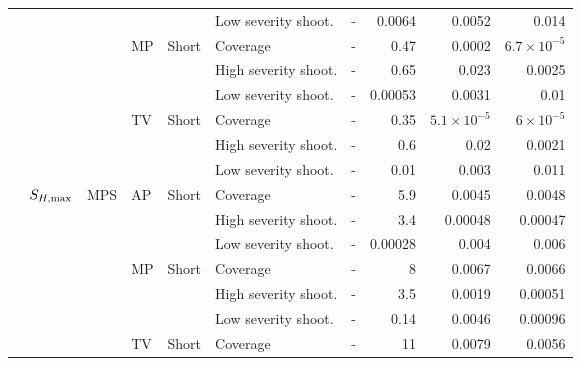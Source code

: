 \documentclass[article]{standalone}
\begin{document}
\begin{tabular}{llllllrrrr}
             &                   &    &    &       & Low severity shoot. &                    - &    0.0064 &               0.0052 &                 0.014 \\
             &                   &    & MP & Short & Coverage &                    - &      0.47 &               0.0002 &  $6.7 \times 10^{-5}$ \\
             &                   &    &    &       & High severity shoot. &                    - &      0.65 &                0.023 &                0.0025 \\
             &                   &    &    &       & Low severity shoot. &                    - &   0.00053 &               0.0031 &                  0.01 \\
             &                   &    & TV & Short & Coverage &                    - &      0.35 & $5.1 \times 10^{-5}$ &    $6 \times 10^{-5}$ \\
             &                   &    &    &       & High severity shoot. &                    - &       0.6 &                 0.02 &                0.0021 \\
             &                   &    &    &       & Low severity shoot. &                    - &      0.01 &                0.003 &                 0.011 \\
             & $S_{H, \rm{max}}$ & MPS & AP & Short & Coverage &                    - &       5.9 &               0.0045 &                0.0048 \\
             &                   &    &    &       & High severity shoot. &                    - &       3.4 &              0.00048 &               0.00047 \\
             &                   &    &    &       & Low severity shoot. &                    - &   0.00028 &                0.004 &                 0.006 \\
             &                   &    & MP & Short & Coverage &                    - &         8 &               0.0067 &                0.0066 \\
             &                   &    &    &       & High severity shoot. &                    - &       3.5 &               0.0019 &               0.00051 \\
             &                   &    &    &       & Low severity shoot. &                    - &      0.14 &               0.0046 &               0.00096 \\
             &                   &    & TV & Short & Coverage &                    - &        11 &               0.0079 &                0.0056 \\

\end{tabular}
\end{document}
